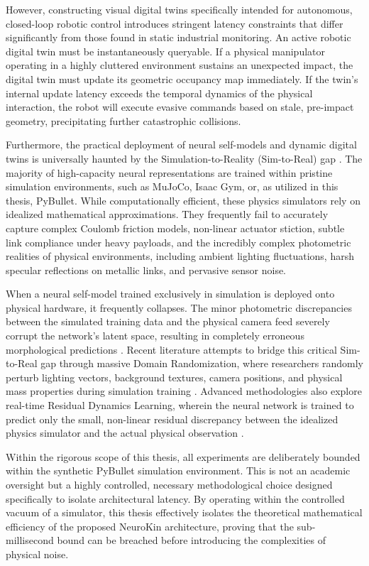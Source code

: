 \documentclass[12pt,a4paper,oneside]{report}
\begin{document}
However, constructing visual digital twins specifically intended for autonomous, closed-loop robotic control introduces stringent latency constraints that differ significantly from those found in static industrial monitoring. An active robotic digital twin must be instantaneously queryable. If a physical manipulator operating in a highly cluttered environment sustains an unexpected impact, the digital twin must update its geometric occupancy map immediately. If the twin's internal update latency exceeds the temporal dynamics of the physical interaction, the robot will execute evasive commands based on stale, pre-impact geometry, precipitating further catastrophic collisions.

Furthermore, the practical deployment of neural self-models and dynamic digital twins is universally haunted by the Simulation-to-Reality (Sim-to-Real) gap \cite{tan2018simtoreal, aljalbout2026realitygap}. The majority of high-capacity neural representations are trained within pristine simulation environments, such as MuJoCo, Isaac Gym, or, as utilized in this thesis, PyBullet. While computationally efficient, these physics simulators rely on idealized mathematical approximations. They frequently fail to accurately capture complex Coulomb friction models, non-linear actuator stiction, subtle link compliance under heavy payloads, and the incredibly complex photometric realities of physical environments, including ambient lighting fluctuations, harsh specular reflections on metallic links, and pervasive sensor noise.

When a neural self-model trained exclusively in simulation is deployed onto physical hardware, it frequently collapses. The minor photometric discrepancies between the simulated training data and the physical camera feed severely corrupt the network's latent space, resulting in completely erroneous morphological predictions \cite{rezvani2024robust}. Recent literature attempts to bridge this critical Sim-to-Real gap through massive Domain Randomization, where researchers randomly perturb lighting vectors, background textures, camera positions, and physical mass properties during simulation training \cite{tan2018simtoreal}. Advanced methodologies also explore real-time Residual Dynamics Learning, wherein the neural network is trained to predict only the small, non-linear residual discrepancy between the idealized physics simulator and the actual physical observation \cite{qiu2024swim2real, lim2025splat2real}.

Within the rigorous scope of this thesis, all experiments are deliberately bounded within the synthetic PyBullet simulation environment. This is not an academic oversight but a highly controlled, necessary methodological choice designed specifically to isolate architectural latency. By operating within the controlled vacuum of a simulator, this thesis effectively isolates the theoretical mathematical efficiency of the proposed NeuroKin architecture, proving that the sub-millisecond bound can be breached before introducing the complexities of physical noise.
\end{document}
